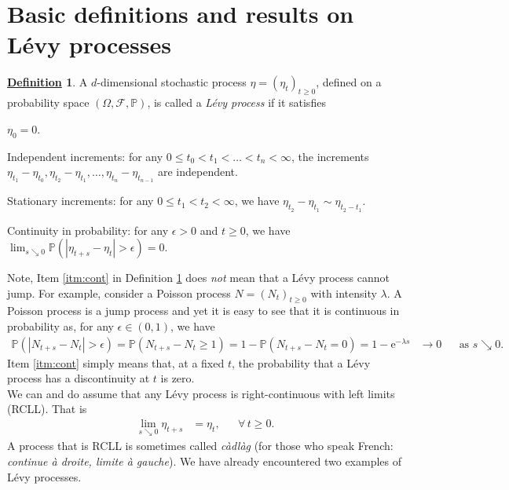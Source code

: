 \documentclass[12pt]{book}
\let\varepsilon\epsilon
\numberwithin{equation}{chapter}
\theoremstyle{plain}
\numberwithin{theorem}{section}
\theoremstyle{definition}
\newtheorem{definition}[theorem]{\underline{Definition}}
\numberwithin{exercise}{chapter}
\newcommand{\<}{\langle}
\renewcommand{\>}{\rangle}
\renewcommand{\(}{\left(}
\renewcommand{\)}{\right)}
\renewcommand{\[}{\left[}
\renewcommand{\]}{\right]}
\newcommand\Pb{\mathds{P}}
\newcommand\Fc{\mathscr{F}}
\newcommand\eps{\varepsilon}
\newcommand\Om{\Omega}
\newcommand\lam{\lambda}
\newcommand\ee{\mathrm{e}}
\begin{document}
\section{Basic definitions and results on L\'evy processes}

\begin{definition}
\label{def:levy}
A $d$-dimensional stochastic process $\eta = (\eta_t)_{t \geq 0}$, defined on a probability space $(\Om,\Fc,\Pb)$, is called a \emph{L\'evy process} if it satisfies
\begin{enumerate*}
\item $\eta_0 = 0$. \label{itm:0}
\item Independent increments: for any $0 \leq t_0 < t_1 < \ldots < t_n < \infty$, the increments $\eta_{t_1} - \eta_{t_0}, \eta_{t_2} - \eta_{t_1}, \ldots, \eta_{t_n} - \eta_{t_{n-1}}$ are independent. \label{itm:ind}
\item Stationary increments: for any $0 \leq t_1 < t_2 < \infty$, we have $\eta_{t_2} - \eta_{t_1} \sim \eta_{t_2-t_1}$. \label{itm:station}
\item Continuity in probability: for any $\eps > 0$ and $t \geq 0$, we have $\lim_{s \searrow 0} \Pb( |\eta_{t+s}-\eta_t|>\eps ) = 0$. \label{itm:cont}
\end{enumerate*}
\end{definition}

\noindent
Note, Item \ref{itm:cont} in Definition \ref{def:levy} does \emph{not} mean that a L\'evy process cannot jump.  For example, consider a Poisson process $N = (N_t)_{t \geq 0}$ with intensity $\lam$.  A Poisson process is a jump process and yet it is easy to see that it is continuous in probability as, for any $\eps \in (0,1)$, we have
\begin{align}
\Pb( |N_{t+s}-N_t|>\eps ) = \Pb( N_{t+s}-N_t \geq 1 ) = 1 - \Pb(  N_{t+s}-N_t = 0 ) = 1 - \ee^{- \lam s}
	&\to 0&
	&\text{as $s \searrow 0$}.
\end{align}
Item \ref{itm:cont} simply means that, at a fixed $t$, the probability that a L\'evy process has a discontinuity at $t$ is zero. 
\\[0.5em]
We can and do assume that any L\'evy process is right-continuous with left limits (RCLL).  That is
\begin{align}
\lim_{s \searrow 0} \eta_{t+s}
	&=	\eta_t , &
	&\forall \, t \geq 0 .
\end{align}
A process that is RCLL is sometimes called \emph{c\`adl\`ag} (for those who speak French: \emph{continue \`a droite, limite \`a gauche}).
We have already encountered two examples of L\'evy processes.
\end{document}
